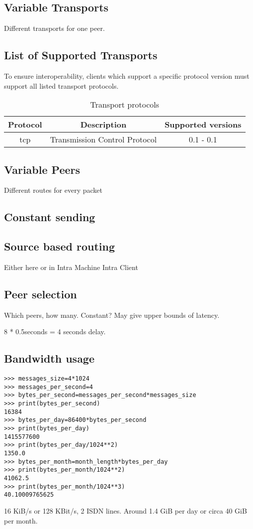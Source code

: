 \documentclass[12pt,a4paper]{article}
\begin{document}
\subsection{Variable Transports}
Different transports for one peer.
\subsection{List of Supported Transports}
To ensure interoperability, clients which support a specific
protocol version must support all listed transport protocols.
\begin{longtable}{|c|c|c|}
\caption{Transport protocols}\\
\hline
\textbf{Protocol} & \textbf{Description} & \textbf{Supported versions}\\
\hline
tcp & Transmission Control Protocol & 0.1 - 0.1\\
\hline
\end{longtable}

\subsection{Variable Peers}
Different routes for every packet
\subsection{Constant sending}

\subsection{Source based routing}
Either here or in Intra Machine Intra Client
\subsection{Peer selection}
Which peers, how many. Constant? May give upper bounds of latency.

8 * 0.5seconds = 4 seconds delay.

\subsection{Bandwidth usage}
\begin{verbatim}
>>> messages_size=4*1024
>>> messages_per_second=4
>>> bytes_per_second=messages_per_second*messages_size
>>> print(bytes_per_second)
16384
>>> bytes_per_day=86400*bytes_per_second
>>> print(bytes_per_day)
1415577600
>>> print(bytes_per_day/1024**2)
1350.0
>>> bytes_per_month=month_length*bytes_per_day
>>> print(bytes_per_month/1024**2)
41062.5
>>> print(bytes_per_month/1024**3)
40.10009765625
\end{verbatim}
16 KiB/s or 128 KBit/s, 2 ISDN lines. Around 1.4 GiB per day or
circa 40 GiB per month.
\end{document}
